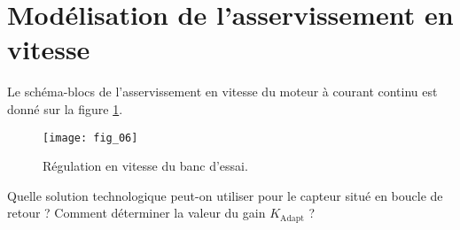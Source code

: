 %
%
%


\section*{Modélisation de l'asservissement en vitesse}

\ifprof
\else


Le schéma-blocs de l'asservissement en vitesse du moteur à courant continu est donné sur la figure \ref{btp_fig_06}.
 

\begin{figure}[!h]
\texttt{[image: fig\_06]}

\caption{Régulation en vitesse du banc d'essai.}
\label{btp_fig_06}
\end{figure}

\fi


\begin{question}
Quelle solution technologique peut-on utiliser pour le capteur situé en boucle de retour ? Comment déterminer la valeur du gain $K_{\text{Adapt}}$ ?
\end{question}


